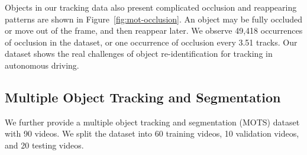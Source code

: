 Objects in our tracking data also present complicated occlusion and reappearing patterns are shown in Figure~\ref{fig:mot-occlusion}. An object may be fully occluded or move out of the frame, and then reappear later. We observe 49,418 occurrences of occlusion in the dataset, or one occurrence of occlusion every 3.51 tracks. Our dataset shows the real challenges of object re-identification for tracking in autonomous driving.


\subsection{Multiple Object Tracking and Segmentation}

We further provide a multiple object tracking and segmentation (MOTS) dataset with 90 videos. We split the dataset into 60 training videos, 10 validation videos, and 20 testing videos.


\begin{table}[htp]
\centering
{}
\caption{\small Comparisons with other MOTS and VOS datasets. }
\label{tab:seg_tracking_label_comp}
\end{table}

